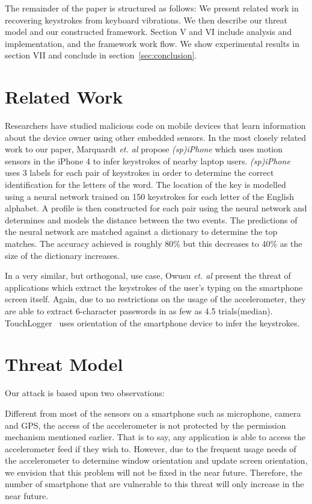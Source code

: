 \documentclass[11pt,conference]{IEEEtran}
\begin{document}
The remainder of the paper is structured as follows: 
We present related work in recovering keystrokes from keyboard vibrations. We then describe our threat model and our constructed framework. Section V and VI include analysis and implementation, and the framework work flow. We show experimental results in section VII and conclude in section~\ref{sec:conclusion}.

\section{Related Work}
\noindent Researchers have studied malicious code on mobile devices that
learn information about the device owner using other embedded sensors.
In the most closely related work to our paper, Marquardt \emph{et. al}
\cite{spiphone} propose \emph{(sp)iPhone} which uses motion sensors in the
iPhone 4
to infer keystrokes of nearby laptop users. \emph{(sp)iPhone} uses 3 labels for
each pair of keystrokes in order to determine the correct identification for
the letters of the word. The location of the key is modelled using a neural
network trained on 150 keystrokes for each letter of the English alphabet.
A profile is then constructed for each pair using the neural network and
determines and models the distance between the two events. The predictions
of the neural network are matched against a dictionary to determine the top
matches. The accuracy achieved is roughly 80\% but this decreases to 40\%
as the size of the dictionary increases.

In a very similar, but orthogonal, use case, Owusu \emph{et. al}
\cite{owusu2012accessory}
present the threat of applications which extract the keystrokes of the
user's typing on the smartphone screen itself. Again, due to no restrictions
on the usage of the accelerometer, they are able to extract 6-character
passwords in as few as 4.5 trials(median). TouchLogger~\cite{cai2011touchlogger}
uses orientation of the smartphone device to infer the keystrokes.

\section{Threat Model}
\noindent Our attack is based upon two observations:

Different from most of the sensors on a smartphone such as microphone, camera and GPS, the access of the accelerometer is not protected by the permission mechanism mentioned earlier. That is to say, any application is able to access the accelerometer feed if they wish to. However, due to the frequent usage needs of the accelerometer to determine window orientation and update screen orientation, we envision that this problem will not be fixed in the near future. Therefore, the number of smartphone that are vulnerable to this threat will only increase in the near future.
\end{document}
